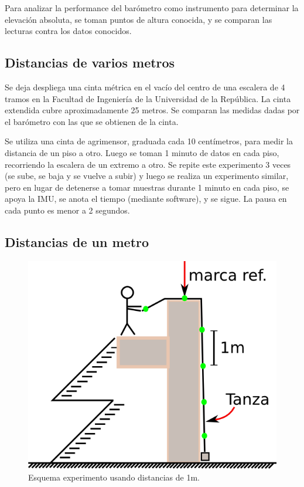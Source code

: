\documentclass[main]{subfiles}
\begin{document}
Para analizar la performance del barómetro como instrumento para determinar la elevación absoluta, se toman puntos de altura conocida, y se comparan las lecturas contra los datos conocidos.

\subsection{Distancias de varios metros}

Se deja despliega una cinta métrica en el vacío del centro de una escalera de 4 tramos en la Facultad de Ingeniería de la Universidad de la República. La cinta extendida cubre aproximadamente 25 metros. Se comparan las medidas dadas por el barómetro con las que se obtienen de la cinta.

Se utiliza una cinta de agrimensor, graduada cada 10 centímetros, para medir la distancia de un piso a otro. Luego se toman 1 minuto de datos en cada piso, recorriendo la escalera de un extremo a otro. Se repite este experimento 3 veces (se sube, se baja y se vuelve a subir) y luego se realiza un experimento similar, pero en lugar de detenerse a tomar muestras durante 1 minuto en cada piso, se apoya la IMU, se anota el tiempo (mediante software), y se sigue. La pausa en cada punto es menor a 2 segundos.

\subsection{Distancias de un metro}

\begin{figure}
\vspace{-40pt}
\hspace{20pt}
  \includegraphics[width=.35\textwidth]{./pics_barom/imerl.png}
  \caption{Esquema experimento usando distancias de 1m.}
  \label{fig:imerl.png}
\vspace{-15pt}
\end{figure}
\end{document}
